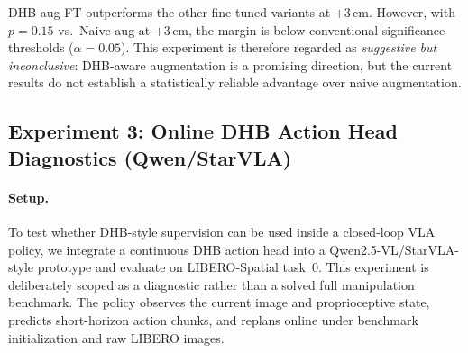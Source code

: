 \documentclass[11pt]{article}
\begin{document}
DHB-aug FT outperforms the other fine-tuned variants at $+3$\,cm. However, with $p=0.15$ vs.\ Naive-aug at $+3$\,cm, the margin is below conventional significance thresholds ($\alpha=0.05$). This experiment is therefore regarded as \emph{suggestive but inconclusive}: DHB-aware augmentation is a promising direction, but the current results do not establish a statistically reliable advantage over naive augmentation.

\subsection{Experiment 3: Online DHB Action Head Diagnostics (Qwen/StarVLA)}\label{sec:exp-online-action-head}
\paragraph{Setup.}
To test whether DHB-style supervision can be used inside a closed-loop VLA policy, we integrate a continuous DHB action head into a Qwen2.5-VL/StarVLA-style prototype and evaluate on LIBERO-Spatial task~0. This experiment is deliberately scoped as a diagnostic rather than a solved full manipulation benchmark. The policy observes the current image and proprioceptive state, predicts short-horizon action chunks, and replans online under benchmark initialization and raw LIBERO images.
\end{document}
